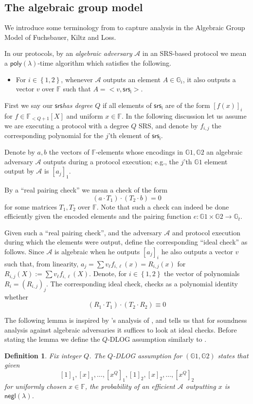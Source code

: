 \documentclass[11pt]{article} %
\newcommand{\Gi}{\ensuremath{{\mathbb G}_i}\xspace}
\newcommand{\G}{\ensuremath{{\mathbb G}}\xspace}
\newcommand{\Gt}{\ensuremath{{\mathbb G}_t}\xspace}
\newcommand{\F}{\ensuremath{\mathbb F}\xspace}
\newcommand{\adv}{\ensuremath{\mathcal A}\xspace}
\newcommand{\srs}{\ensuremath{\mathsf{srs}}\xspace}
\newcommand{\srsi}{\ensuremath{\mathsf{srs_i}}\xspace}
\newcommand{\negl}{\ensuremath{\mathsf{negl}(\lambda)}\xspace}
\newcommand{\defeq}{:=}
\newcommand{\enci}[1]{\ensuremath{\left[#1\right]_i}\xspace}
\newcommand{\enc}[1]{\ensuremath{\left[#1\right]_1}\xspace}
\newcommand{\enctwo}[1]{\ensuremath{\left[#1\right]_2}\xspace}
\newcommand{\set}[1]{\ensuremath{\left\{#1\right\}}\xspace}
\newcommand{\polysofdeg}[1]{\ensuremath{\F_{< #1}[X]}\xspace}
\newtheorem{dfn}[lemma]{Definition}
\newcommand{\poly}{\ensuremath{\mathsf{poly(\lambda)}}\xspace}
\begin{document}
\subsection{The algebraic group model}\label{subsec:agm}
We introduce some terminology from \cite{plonk} to capture analysis in the Algebraic Group Model of Fuchsbauer, Kiltz and Loss\cite{AGM}.

In our protocols, by an \emph{algebraic adversary} \adv in an SRS-based protocol we mean a \poly-time algorithm which satisfies the following.
\begin{itemize}
 \item For $i\in \set{1,2}$, whenever \adv outputs an element $A\in \Gi$, it also outputs a vector $v$ over \F such that $A = <v,\srsi>$.
\end{itemize}

First we say our \srs \emph{has degree $Q$} if all elements of \srsi are of the form  \enci{f(x)} for $f\in \polysofdeg{Q+1}$ and uniform $x\in \F$. In the following discussion let us assume we are executing a protocol with a degree $Q$ SRS, and denote by $f_{i,j}$ the corresponding polynomial for the $j$'th element of \srsi.

Denote by $a,b$ the vectors of $\F$-elements whose encodings in $\G1,\G2$ an algebraic adversary \adv outputs during a protocol execution; e.g., the $j$'th $\G1$ element output by \adv is \enc{a_j}.

By a ``real pairing check'' we mean a check of the form
\[(a\cdot T_1) \cdot (T_2\cdot b)=0\]
for some matrices $T_1,T_2$ over $\F$.
Note that such a check can indeed be done efficiently given the encoded elements and the pairing function $e:\G1\times \G2\to \Gt$.



Given such a ``real pairing check'', and the adversary \adv and protocol execution during which the elements were output, define the corresponding ``ideal check'' as follows.
Since \adv is algebraic when he outputs \enci{a_j} he also outputs a vector $v$ such that, from linearity, $a_j = \sum v_\ell f_{i,\ell}(x)=R_{i,j}(x)$ for $R_{i,j}(X) \defeq \sum v_\ell f_{i,\ell}(X)$.
Denote, for $i\in \set{1,2}$ the vector of polynomials $R_i=(R_{i,j})_j$.
The corresponding ideal check, checks as a polynomial identity whether
\[(R_1 \cdot T_1)\cdot (T_2\cdot R_2) \equiv 0\]


The following lemma is inspired by \cite{AGM}'s analysis of \cite{Groth16},
and tells us that for soundness analysis against algebraic adversaries it suffices to look at ideal checks.
Before stating the lemma we define the $Q$-DLOG assumption similarly to \cite{AGM}.
\begin{dfn}\label{ref:qdlog}
 Fix integer $Q$. The \emph{$Q$-DLOG assumption for $(\G1,\G2)$} states that given 
 \[\enc{1},\enc{x},\ldots,\enc{x^Q},\enctwo{1},\enctwo{x},\ldots,\enctwo{x^Q}\]
 for uniformly chosen $x\in \F$, the probability of an efficient \adv outputting $x$
 is \negl.
\end{dfn}
\end{document}
